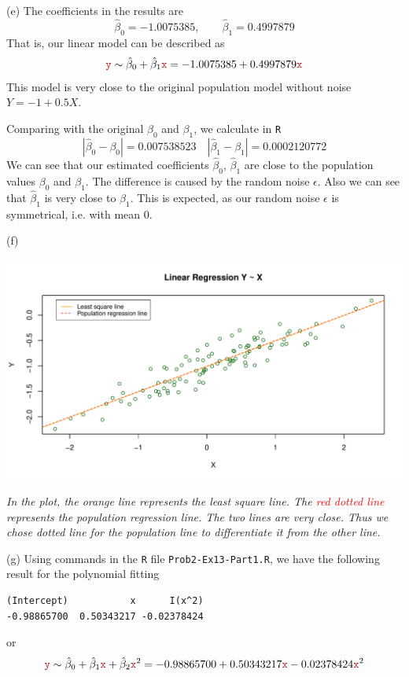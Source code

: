 \documentclass[a4paper,12pt]{article}
\newcommand{\code}[1]{\texttt{#1}}
\begin{document}
(e)
The coefficients in the results are
\[
    \hat\beta_0 = -1.0075385,\qquad 
    \hat\beta_1 = 0.4997879
\]
That is, our linear model can be described as 
\[
    \yr \sim \hat\beta_0 + \hat\beta_1\xr 
    = -1.0075385 + 0.4997879\xr
\]
This model is very close to the original population model without noise $Y = -1 + 0.5X$.

Comparing with the original $\beta_0$ and $\beta_1$, we calculate in \code{R}
\[
    |\hat\beta_0 - \beta_0| = 0.007538523 \quad 
    |\hat\beta_1 - \beta_1| = 0.0002120772
\]
We can see that our estimated coefficients $\hat\beta_0$, $\hat\beta_1$ are close to the population values $\beta_0$ and $\beta_1$. The difference is caused by the random noise $\epsilon$. 
Also we can see that $\hat\beta_1$ is very close to $\beta_1$. This is expected, as our random noise $\epsilon$ is symmetrical, i.e. with mean 0.
\bigskip




(f)
\begin{center}
    \includegraphics[width=0.9\linewidth]{Images/Prob2-Ex13-h-f.pdf}
    
    \parbox{0.65\textwidth}{\textit{In the plot, the \textcolor{myorange}{orange line} represents the least square line. The \textcolor{red}{red dotted line} represents the population regression line. The two lines are very close. Thus we chose dotted line for the population line to differentiate it from the other line.
    }}
\end{center}
\bigskip




(g)
Using commands in the \code{R} file \code{Prob2-Ex13-Part1.R}, we have the following result for the polynomial fitting 
\begin{verbatim}
(Intercept)           x      I(x^2) 
-0.98865700  0.50343217 -0.02378424  
\end{verbatim}
or 
\[
    \yr \sim \hat{\beta}_0 + \hat{\beta}_1\xr + \hat{\beta}_2 \xr^2
    =
    -0.98865700
    + 0.50343217 \xr 
    -0.02378424 \xr^2 
\]
\end{document}
